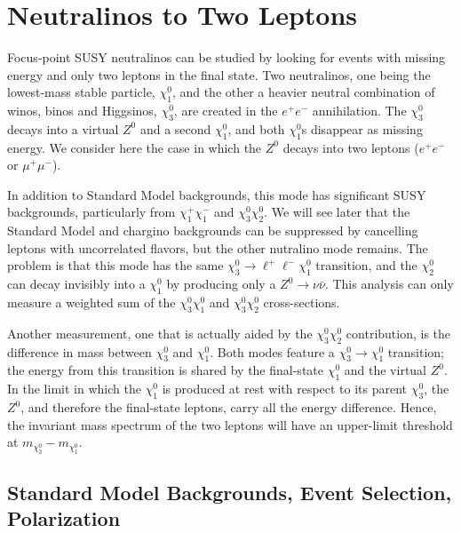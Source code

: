 \documentclass[12pt]{article}
\begin{document}
\section{Neutralinos to Two Leptons}

Focus-point SUSY neutralinos can be studied by looking for events with
missing energy and only two leptons in the final state.  Two
neutralinos, one being the lowest-mass stable particle, $\chi_1^0$,
and the other a heavier neutral combination of winos, binos and
Higgsinos, $\chi_3^0$, are created in the $e^+e^-$ annihilation.  The
$\chi_3^0$ decays into a virtual $Z^0$ and a second $\chi_1^0$, and
both $\chi_1^0$s disappear as missing energy.  We consider here the
case in which the $Z^0$ decays into two leptons ($e^+e^-$ or
$\mu^+\mu^-$).

In addition to Standard Model backgrounds, this mode has significant
SUSY backgrounds, particularly from $\chi_1^+\chi_1^-$ and
$\chi_3^0\chi_2^0$.  We will see later that the Standard Model and
chargino backgrounds can be suppressed by cancelling leptons with
uncorrelated flavors, but the other nutralino mode remains.  The
problem is that this mode has the same $\chi_3^0 \to \ell^+ \ell^-
\chi_1^0$ transition, and the $\chi_2^0$ can decay invisibly into a
$\chi_1^0$ by producing only a $Z^0 \to \nu\bar{\nu}$.  This analysis
can only measure a weighted sum of the $\chi_3^0\chi_1^0$ and
$\chi_3^0\chi_2^0$ cross-sections.

Another measurement, one that is actually aided by the
$\chi_3^0\chi_2^0$ contribution, is the difference in mass between
$\chi_3^0$ and $\chi_1^0$.  Both modes feature a $\chi_3^0 \to
\chi_1^0$ transition; the energy from this transition is shared by the
final-state $\chi_1^0$ and the virtual $Z^0$.  In the limit in which
the $\chi_1^0$ is produced at rest with respect to its parent
$\chi_3^0$, the $Z^0$, and therefore the final-state leptons, carry
all the energy difference.  Hence, the invariant mass spectrum of the
two leptons will have an upper-limit threshold at $m_{\chi_3^0} -
m_{\chi_1^0}$.

\subsection{Standard Model Backgrounds, Event Selection, Polarization}
\end{document}

